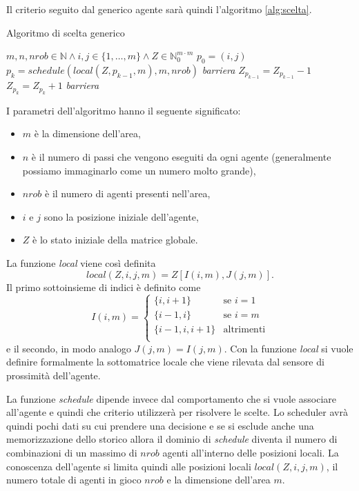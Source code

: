 Il criterio seguito dal generico agente sarà quindi l'algoritmo \ref{alg:scelta}.
\begin{algorithm}
	\caption{Algoritmo di scelta generico}
	\label{alg:scelta}
	\begin{algorithmic}
		\REQUIRE $m,n,nrob \in \mathbb{N} \wedge i,j \in \{1,\dots,m\} \wedge Z \in \mathbb{N}_0^{m\cdot m} $
		\STATE $p_0 = (i,j)$
			\STATE $p_k = schedule(local(Z,p_{k-1},m),m,nrob)$
			\STATE \emph{barriera}
			\STATE $Z_{p_{k-1}} = Z_{p_{k-1}} - 1$
			\STATE $Z_{p_{k}} = Z_{p_{k}} + 1$
			\STATE \emph{barriera}
		\ENDFOR
	\end{algorithmic}
\end{algorithm}
I parametri dell'algoritmo hanno il seguente significato:
\begin{itemize}
	\item $m$ è la dimensione dell'area,
	\item $n$ è il numero di passi che vengono eseguiti da ogni agente (generalmente possiamo immaginarlo come un numero molto grande),
	\item $nrob$ è il numero di agenti presenti nell'area,
	\item $i$ e $j$ sono la posizione iniziale dell'agente,
	\item $Z$ è lo stato iniziale della matrice globale.
\end{itemize}

La funzione \emph{local} viene così definita
$$ local(Z,i,j,m) = Z[I(i,m),J(j,m)]. $$
Il primo sottoinsieme di indici è definito come
$$ I(i,m) =
\left\{
\begin{array}{ll}
	\{i, i+1\} & \mbox{se } i = 1 \\
	\{i-1, i\} & \mbox{se } i = m \\
	\{i-1, i, i+1\} & \mbox{altrimenti} \\
\end{array}
\right.
$$
e il secondo, in modo analogo $J(j,m) = I(j,m)$. Con la funzione \emph{local} si vuole definire formalmente la sottomatrice locale che viene rilevata dal sensore di prossimità dell'agente.

La funzione \emph{schedule} dipende invece dal comportamento che si vuole associare all'agente e quindi che criterio utilizzerà per risolvere le scelte. Lo scheduler avrà quindi pochi dati su cui prendere una decisione e se si esclude anche una memorizzazione dello storico allora il dominio di \emph{schedule} diventa il numero di combinazioni di un massimo di $nrob$ agenti all'interno delle posizioni locali. La conoscenza dell'agente si limita quindi alle posizioni locali $local(Z,i,j,m)$, il numero totale di agenti in gioco $nrob$ e la dimensione dell'area $m$.

